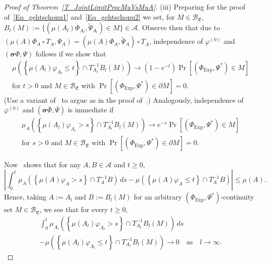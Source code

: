 \documentclass[AHL,Unicode,longabstracts]{cedram}
\newcommand{\clA}{\mathcal{A}}
\newcommand{\clB}{\mathcal{B}}
\newcommand{\Expl}{\mathrm{Exp}}
\newcommand{\bfsig}{\boldsymbol{\sigma}}
\newcommand{\frkE}{\mathfrak{E}}
\begin{document}
\begin{proof}[{Proof of Theorem~\ref{T_JointLimitProcMuVsMuA}}]
\vspace{6pt}
\noindent (iii) Preparing for the proof of~\eqref{Eq_gehtschonu1} and~\eqref{Eq_gehtschonu2} we set, for $M\in\clB_{\frkE}$, $B_{l}(M):=\{(\mu(A_{l})\Phi_{A_{l} },\widetilde{\Psi}_{A_{l}})\in M\}\in\clA$. Observe then that due to $(\mu(A)\Phi_{A}\circ T_{A},\Psi_{A})=(\mu(A)\Phi_{A},\widetilde{\Psi} _{A})\circ T_{A}$, independence of $\varphi^{(0)}$ and $(\bfsig
\Phi,\Psi)$ follows if we show that
\begin{equation}\label{Eq_bhbhggggg1}
\begin{gathered}
\mu\left(\left\{\mu(A_{l})\varphi_{A_{l}}\leq t\right\}\cap T_{A_{l}}^{-1} B_{l}(M)\right) \longrightarrow\left(1-e^{-t}\right)\Pr\left[\left(\Phi_{\Expl},\Psi^{\ast }\right)\in M\right]\\
\text{for }t>0\text{ and }M\in\clB_{\frkE}\text{ with }\Pr \left[\left(\Phi_{\Expl},\Psi^{\ast}\right)\in\partial M\right]=0.
\end{gathered}
\end{equation}
(Use a variant of~\cite[Theorem~2.3]{Bi} to argue as in the proof of~\cite[Theorem~2.8]{Bi}.) Analogously, independence of $\overline{\varphi}^{(0)}$ and $(\bfsig\overline{\Phi},\overline{\Psi})$ is immediate if
\begin{equation}\label{Eq_bhbhggggg}
\begin{gathered}
\mu_{A}\left(\left\{\mu(A_{l})\varphi_{A_{l}}>s\right\}\cap T_{A_{l}}^{-1} B_{l}(M)\right) \longrightarrow e^{-s}\Pr\left[\left(\Phi_{\Expl},\Psi^{\ast }\right)\in M\right]\\
\text{for }s>0\text{ and }M\in\clB_{\frkE}\text{ with }\Pr \left[\left(\Phi_{\Expl},\Psi^{\ast}\right)\in\partial M\right]=0.
\end{gathered}
\end{equation}


Now~\cite[Lemma~4.1]{Z11} shows that for any $A,B\in\clA$ and $t\geq0$,
\begin{equation}
\left\vert \int_{0}^{t}\mu_{A}\left(\left\{\mu(A)\varphi_{A}>s\right\}\cap T_{A} ^{-1}B\right) \,ds-\mu\left(\left\{\mu(A)\varphi_{A}\leq t\right\}\cap T_{A} ^{-1}B\right) \right\vert \leq\mu(A).
\end{equation}
Hence, taking $A:=A_{l}$ and $B:=B_{l}(M)$ for an arbitrary $(\Phi _{\Expl},\Psi^{\ast})$-continuity set $M\in\clB_{\frkE}$, we see that for every $t\geq0$,
\begin{multline}\label{Eq_KeyFromZ11Nice}
\int_{0}^{t}\mu_{A_{l}}  \left(\left\{\mu(A_{l})\varphi_{A_{l}}>s\right\}\cap T_{A_{l}}^{-1}B_{l}(M)\right) \,ds\\
-\mu\left(\left\{\mu(A_{l})\varphi_{A_{l}}\leq t\right\}\cap T_{A_{l}}^{-1} B_{l}(M)\right) \longrightarrow0\quad\text{as}\quad l\rightarrow\infty.
\end{multline}



\end{proof}
\end{document}
